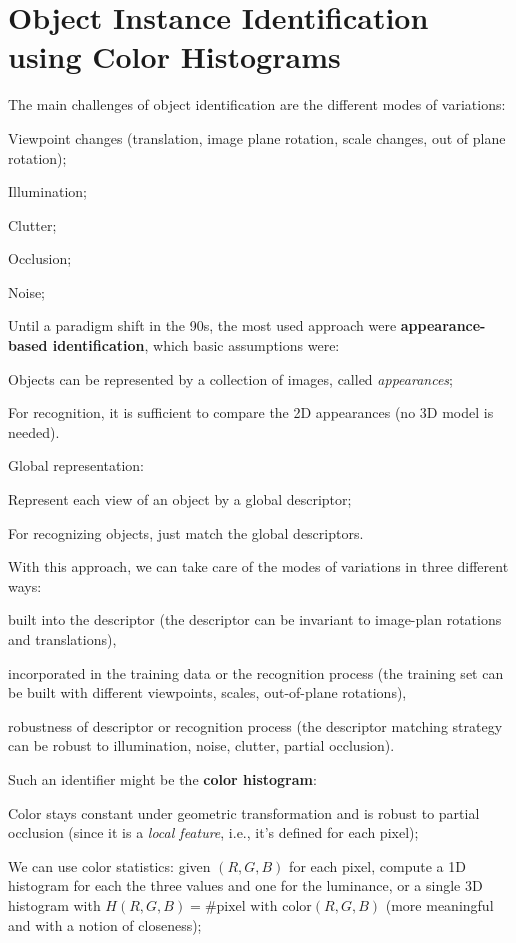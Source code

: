 \section{Object Instance Identification using Color Histograms}\label{sec:histograms}

The main challenges of object identification are the different modes of variations:
\begin{myitem}
    \item Viewpoint changes (translation, image plane rotation, scale changes, out of plane rotation);
    \item Illumination;
    \item Clutter;
    \item Occlusion;
    \item Noise;
\end{myitem}

Until a paradigm shift in the 90s, the most used approach were \textbf{appearance-based identification}, which basic assumptions were:
\begin{myitem}
    \item Objects can be represented by a collection of images, called \textit{appearances};
    \item For recognition, it is sufficient to compare the 2D appearances (no 3D model is needed).
\end{myitem}

Global representation:
\begin{myitem}
    \item Represent each view of an object by a global descriptor;
    \item For recognizing objects, just match the global descriptors.
\end{myitem}
With this approach, we can take care of the modes of variations in three different ways:
\begin{myitem}
    \item built into the descriptor (the descriptor can be invariant to image-plan rotations and translations),
    \item incorporated in the training data or the recognition process (the training set can be built with different viewpoints, scales, out-of-plane rotations),
    \item robustness of descriptor or recognition process (the descriptor matching strategy can be robust to illumination, noise, clutter, partial occlusion).
\end{myitem}

Such an identifier might be the \textbf{color histogram}:
\begin{myitem}
    \item Color stays constant under geometric transformation and is robust to partial occlusion (since it is a \textit{local feature}, i.e., it's defined for each pixel);
    \item We can use color statistics: given $(R,G,B)$ for each pixel, compute a 1D histogram for each the three values and one for the luminance, or a single 3D histogram with $H(R,G,B) = \# \text{pixel with color} (R,G,B)$ (more meaningful and with a notion of closeness);
\end{myitem}

